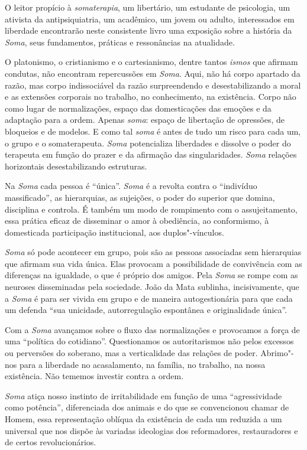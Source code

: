 O leitor propício à \emph{somaterapia}, um libertário, um estudante de
psicologia, um ativista da antipsiquiatria, um acadêmico, um jovem ou
adulto, interessados em liberdade encontrarão neste consistente livro
uma exposição sobre a história da \emph{Soma}, seus fundamentos,
práticas e ressonâncias na atualidade.

O platonismo, o cristianismo e o cartesianismo, dentre tantos
\emph{ismos} que afirmam condutas, não encontram repercussões em
\emph{Soma}. Aqui, não há corpo apartado da razão, mas corpo
indissociável da razão surpreendendo e desestabilizando a moral e as
extensões corporais no trabalho, no conhecimento, na existência. Corpo
não como lugar de normalizações, espaço das domesticações das emoções e
da adaptação para a ordem. Apenas \emph{soma}: espaço de libertação de
opressões, de bloqueios e de modelos. E como tal \emph{soma} é antes de
tudo um risco para cada um, o grupo e o somaterapeuta. \emph{Soma}
potencializa liberdades e dissolve o poder do terapeuta em função do
prazer e da afirmação das singularidades. \emph{Soma} relações
horizontais desestabilizando estruturas.

Na \emph{Soma} cada pessoa é ``única''. \emph{Soma} é a revolta contra o
``indivíduo massificado'', as hierarquias, as sujeições, o poder do
superior que domina, disciplina e controla. É também um modo de
rompimento com o assujeitamento, essa prática eficaz de disseminar o
amor à obediência, ao conformismo, à domesticada participação
institucional, aos duplos"-vínculos.

\emph{Soma} só pode acontecer em grupo, pois são as pessoas associadas
sem hierarquias que afirmam sua vida única. Elas provocam a
possibilidade de convivência com as diferenças na igualdade, o que é
próprio dos amigos. Pela \emph{Soma} se rompe com as neuroses
disseminadas pela sociedade. João da Mata sublinha, incisivamente, que a
\emph{Soma} é para ser vivida em grupo e de maneira autogestionária para
que cada um defenda ``sua unicidade, autorregulação espontânea e
originalidade única''.

Com a \emph{Soma} avançamos sobre o fluxo das normalizações e provocamos
a força de uma ``política do cotidiano''. Questionamos os autoritarismos
não pelos excessos ou perversões do soberano, mas a verticalidade das
relações de poder. Abrimo"-nos para a liberdade no acasalamento, na
família, no trabalho, na nossa existência. Não tememos investir contra a
ordem.

\emph{Soma} atiça nosso instinto de irritabilidade em função de uma
``agressividade como potência'', diferenciada dos animais e do que se
convencionou chamar de Homem, essa representação oblíqua da existência
de cada um reduzida a um universal que nos dispõe às variadas ideologias
dos reformadores, restauradores e de certos revolucionários.

